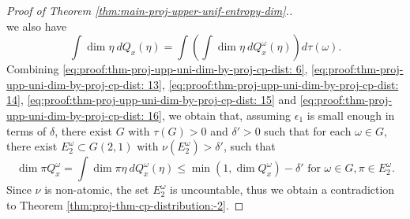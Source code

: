 \documentclass[a4paper,11pt]{amsart}
\theoremstyle{definition}
\numberwithin{equation}{section}
\begin{document}
\begin{proof}[Proof of Theorem \ref{thm:main-proj-upper-unif-entropy-dim}.]
\begin{equation}
\end{equation}
we also have 
\begin{equation}\label{eq:proof:thm-proj-upp-uni-dim-by-proj-cp-dist: 16}
\int \dim  \eta \ dQ_x(\eta) = \int \left(\int \dim  \eta \ dQ_x^\omega(\eta)\right)  d\tau(\omega).
\end{equation}
Combining \eqref{eq:proof:thm-proj-upp-uni-dim-by-proj-cp-dist: 6},  \eqref{eq:proof:thm-proj-upp-uni-dim-by-proj-cp-dist: 13}, \eqref{eq:proof:thm-proj-upp-uni-dim-by-proj-cp-dist: 14}, \eqref{eq:proof:thm-proj-upp-uni-dim-by-proj-cp-dist: 15} and \eqref{eq:proof:thm-proj-upp-uni-dim-by-proj-cp-dist: 16},  we obtain that,  assuming $\epsilon_1$ is small enough in terms of $\delta$,  there exist $G$ with $\tau(G)>0$ and $\delta'>0$ such that for each $\omega\in G$, there exist $E_2^\omega\subset G(2,1)$ with $\nu(E_2^\omega)>\delta'$, such that 
\[
\dim \pi Q_x^\omega  = \int \dim \pi \eta \ dQ_x^\omega(\eta) \le \min(1,\dim Q_x^\omega)-\delta' \textrm{ for } \omega\in G,  \pi\in E_2^\omega.
\]
Since $\nu$ is non-atomic, the set $E_2^\omega$ is uncountable,  thus we obtain a contradiction to Theorem \ref{thm:proj-thm-cp-distribution:-2}.
\end{proof}
\end{document}
